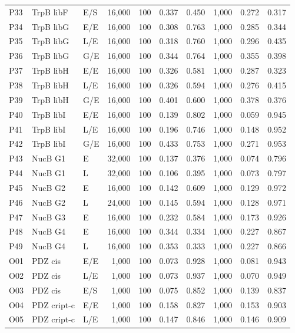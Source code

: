 \begin{longtable}[c]{lllrrrrrrr}
P33 & TrpB libF & E/S & 16,000 & 100 & 0.337 & 0.450 & 1,000 & 0.272 & 0.317 \\
P34 & TrpB libG & E/E & 16,000 & 100 & 0.308 & 0.763 & 1,000 & 0.285 & 0.344 \\
P35 & TrpB libG & L/E & 16,000 & 100 & 0.318 & 0.760 & 1,000 & 0.296 & 0.435 \\
P36 & TrpB libG & G/E & 16,000 & 100 & 0.344 & 0.764 & 1,000 & 0.355 & 0.398 \\
P37 & TrpB libH & E/E & 16,000 & 100 & 0.326 & 0.581 & 1,000 & 0.287 & 0.323 \\
P38 & TrpB libH & L/E & 16,000 & 100 & 0.326 & 0.594 & 1,000 & 0.276 & 0.415 \\
P39 & TrpB libH & G/E & 16,000 & 100 & 0.401 & 0.600 & 1,000 & 0.378 & 0.376 \\
P40 & TrpB libI & E/E & 16,000 & 100 & 0.139 & 0.802 & 1,000 & 0.059 & 0.945 \\
P41 & TrpB libI & L/E & 16,000 & 100 & 0.196 & 0.746 & 1,000 & 0.148 & 0.952 \\
P42 & TrpB libI & G/E & 16,000 & 100 & 0.433 & 0.753 & 1,000 & 0.271 & 0.953 \\
P43 & NucB G1 & E & 32,000 & 100 & 0.137 & 0.376 & 1,000 & 0.074 & 0.796 \\
P44 & NucB G1 & L & 32,000 & 100 & 0.106 & 0.395 & 1,000 & 0.073 & 0.797 \\
P45 & NucB G2 & E & 16,000 & 100 & 0.142 & 0.609 & 1,000 & 0.129 & 0.972 \\
P46 & NucB G2 & L & 24,000 & 100 & 0.145 & 0.594 & 1,000 & 0.128 & 0.971 \\
P47 & NucB G3 & E & 16,000 & 100 & 0.232 & 0.584 & 1,000 & 0.173 & 0.926 \\
P48 & NucB G4 & E & 16,000 & 100 & 0.344 & 0.334 & 1,000 & 0.227 & 0.867 \\
P49 & NucB G4 & L & 16,000 & 100 & 0.353 & 0.333 & 1,000 & 0.227 & 0.866 \\
O01 & PDZ cis & E/E & 1,000 & 100 & 0.073 & 0.928 & 1,000 & 0.081 & 0.943 \\
O02 & PDZ cis & L/E & 1,000 & 100 & 0.073 & 0.937 & 1,000 & 0.070 & 0.949 \\
O03 & PDZ cis & E/S & 1,000 & 100 & 0.075 & 0.852 & 1,000 & 0.139 & 0.837 \\
O04 & PDZ cript-c & E/E & 1,000 & 100 & 0.158 & 0.827 & 1,000 & 0.153 & 0.903 \\
O05 & PDZ cript-c & L/E & 1,000 & 100 & 0.147 & 0.846 & 1,000 & 0.146 & 0.909 \\

\end{longtable}
